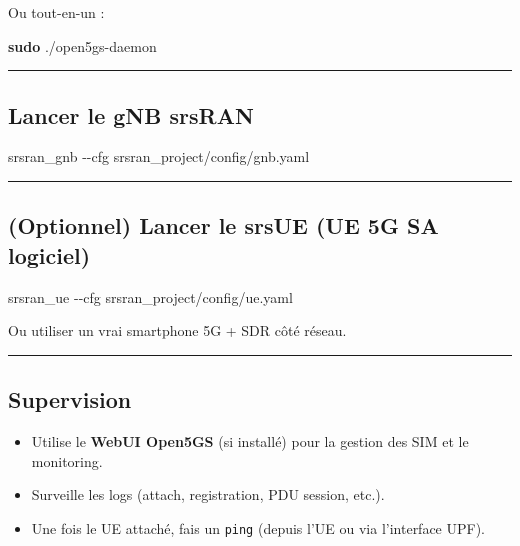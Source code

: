 \documentclass[
  french,
]{article}
\newenvironment{Shaded}{\begin{snugshade}}{\end{snugshade}}
\newcommand{\AttributeTok}[1]{\textcolor[rgb]{0.13,0.29,0.53}{#1}}
\newcommand{\ExtensionTok}[1]{#1}
\newcommand{\FunctionTok}[1]{\textcolor[rgb]{0.13,0.29,0.53}{\textbf{#1}}}
\newcommand{\NormalTok}[1]{#1}
\providecommand{\tightlist}{%
  \setlength{\itemsep}{0pt}\setlength{\parskip}{0pt}}
\begin{document}
Ou tout-en-un :

\begin{Shaded}
\begin{Highlighting}[]
\FunctionTok{sudo}\NormalTok{ ./open5gs{-}daemon}
\end{Highlighting}
\end{Shaded}

\begin{center}\rule{0.5\linewidth}{0.5pt}\end{center}

\subsection{Lancer le gNB srsRAN}\label{lancer-le-gnb-srsran}

\begin{Shaded}
\begin{Highlighting}[]
\ExtensionTok{srsran\_gnb} \AttributeTok{{-}{-}cfg}\NormalTok{ srsran\_project/config/gnb.yaml}
\end{Highlighting}
\end{Shaded}

\begin{center}\rule{0.5\linewidth}{0.5pt}\end{center}

\subsection{(Optionnel) Lancer le srsUE (UE 5G SA
logiciel)}\label{optionnel-lancer-le-srsue-ue-5g-sa-logiciel}

\begin{Shaded}
\begin{Highlighting}[]
\ExtensionTok{srsran\_ue} \AttributeTok{{-}{-}cfg}\NormalTok{ srsran\_project/config/ue.yaml}
\end{Highlighting}
\end{Shaded}

Ou utiliser un vrai smartphone 5G + SDR côté réseau.

\begin{center}\rule{0.5\linewidth}{0.5pt}\end{center}

\subsection{Supervision}\label{supervision}

\begin{itemize}
\tightlist
\item
  Utilise le \textbf{WebUI Open5GS} (si installé) pour la gestion des
  SIM et le monitoring.
\item
  Surveille les logs (attach, registration, PDU session, etc.).
\item
  Une fois le UE attaché, fais un \texttt{ping} (depuis l'UE ou via
  l'interface UPF).
\end{itemize}
\end{document}
